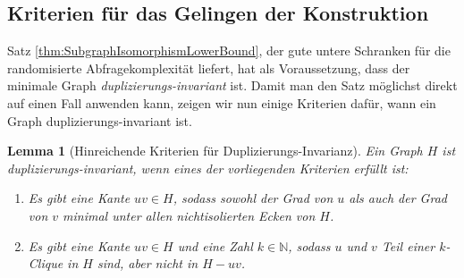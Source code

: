 \documentclass[10pt,a4paper, footheight=1mm, bibliography=totoc]{scrreprt}
\newtheorem{Lemma}[definition]{Lemma}
\theoremstyle{definition}
\begin{document}
\subsection{Kriterien für das Gelingen der Konstruktion}
Satz \ref{thm:SubgraphIsomorphismLowerBound}, der gute
untere Schranken für die randomisierte Abfragekomplexität
liefert, hat als Voraussetzung, dass der minimale Graph
\emph{duplizierungs-invariant} ist. Damit man den 
Satz möglichst direkt auf einen Fall anwenden kann, 
zeigen wir nun einige Kriterien dafür, wann ein
Graph duplizierungs-invariant ist.
\begin{Lemma}[Hinreichende Kriterien für Duplizierungs-Invarianz]
\label{thm:KriterienDuplizierungsInvariant}
Ein Graph $H$ ist duplizierungs-invariant, wenn eines
der vorliegenden Kriterien erfüllt ist:
\begin{enumerate}[label=\textbf{\emph{(\alph*)}}, leftmargin=*]
\item Es gibt eine Kante $uv\in H$, sodass sowohl
           der Grad von $u$ als auch der Grad von $v$
           minimal unter allen nichtisolierten Ecken von $H$.
\item Es gibt eine Kante $uv \in H$ und eine Zahl
           $k\in \mathbb{N}$, sodass $u$ und $v$
           Teil einer $k$-Clique in $H$ sind, aber nicht
           in $H-uv$.
\end{enumerate}
\end{Lemma}
\end{document}
